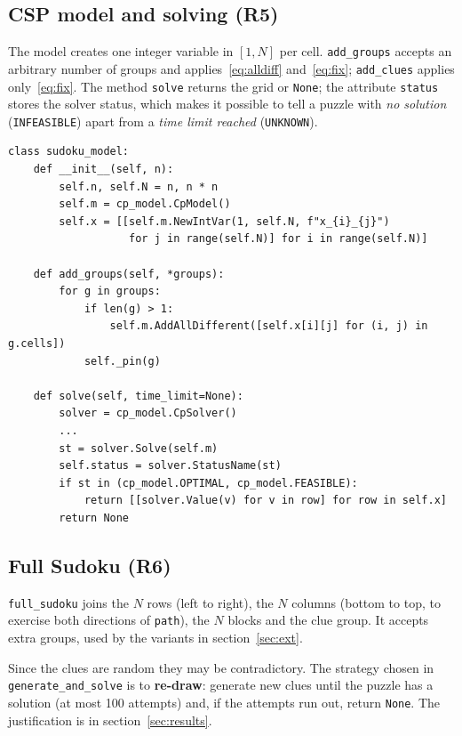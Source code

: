 \documentclass[11pt,a4paper]{article}
\begin{document}
\subsection{CSP model and solving (R5)}

The model creates one integer variable in $[1,N]$ per cell. \texttt{add\_groups} accepts an arbitrary number of groups and applies~\eqref{eq:alldiff} and~\eqref{eq:fix}; \texttt{add\_clues} applies only~\eqref{eq:fix}. The method \texttt{solve} returns the grid or \texttt{None}; the attribute \texttt{status} stores the solver status, which makes it possible to tell a puzzle with \emph{no solution} (\texttt{INFEASIBLE}) apart from a \emph{time limit reached} (\texttt{UNKNOWN}).

\begin{lstlisting}
class sudoku_model:
    def __init__(self, n):
        self.n, self.N = n, n * n
        self.m = cp_model.CpModel()
        self.x = [[self.m.NewIntVar(1, self.N, f"x_{i}_{j}")
                   for j in range(self.N)] for i in range(self.N)]

    def add_groups(self, *groups):
        for g in groups:
            if len(g) > 1:
                self.m.AddAllDifferent([self.x[i][j] for (i, j) in g.cells])
            self._pin(g)

    def solve(self, time_limit=None):
        solver = cp_model.CpSolver()
        ...
        st = solver.Solve(self.m)
        self.status = solver.StatusName(st)
        if st in (cp_model.OPTIMAL, cp_model.FEASIBLE):
            return [[solver.Value(v) for v in row] for row in self.x]
        return None
\end{lstlisting}

\subsection{Full Sudoku (R6)}

\texttt{full\_sudoku} joins the $N$ rows (left to right), the $N$ columns (bottom to top, to exercise both directions of \texttt{path}), the $N$ blocks and the clue group. It accepts extra groups, used by the variants in section~\ref{sec:ext}.

Since the clues are random they may be contradictory. The strategy chosen in \texttt{generate\_and\_solve} is to \textbf{re-draw}: generate new clues until the puzzle has a solution (at most 100 attempts) and, if the attempts run out, return \texttt{None}. The justification is in section~\ref{sec:results}.
\end{document}
